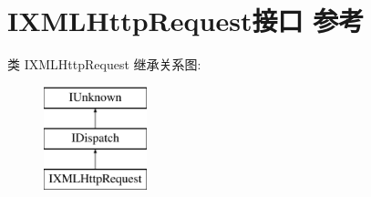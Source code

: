 \hypertarget{interface_i_x_m_l_http_request}{}\section{I\+X\+M\+L\+Http\+Request接口 参考}
\label{interface_i_x_m_l_http_request}
类 I\+X\+M\+L\+Http\+Request 继承关系图\+:\begin{figure}[H]
\begin{center}
\leavevmode
\includegraphics[height=3.000000cm]{interface_i_x_m_l_http_request}
\end{center}
\end{figure}
